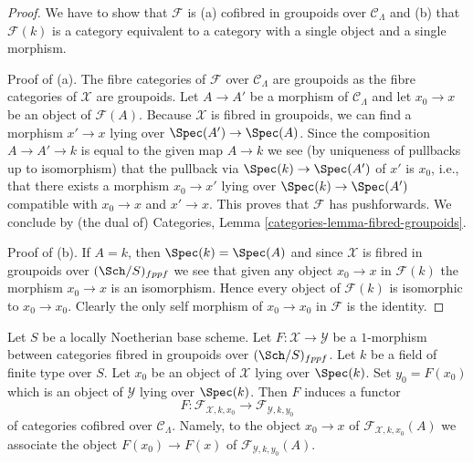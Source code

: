\begin{proof}
We have to show that $\mathcal{F}$ is (a) cofibred in groupoids over
$\mathcal{C}_\Lambda$ and (b) that $\mathcal{F}(k)$ is a category equivalent
to a category with a single object and a single morphism.

\medskip\noindent
Proof of (a). The fibre categories of $\mathcal{F}$
over $\mathcal{C}_\Lambda$ are groupoids as the fibre categories
of $\mathcal{X}$ are groupoids. Let $A \to A'$ be a morphism of
$\mathcal{C}_\Lambda$ and let $x_0 \to x$ be an object of $\mathcal{F}(A)$.
Because $\mathcal{X}$ is fibred in groupoids, we can find a morphism
$x' \to x$ lying over $\Spec(A') \to \Spec(A)$. Since the composition
$A \to A' \to k$ is equal to the given map $A \to k$ we see (by uniqueness
of pullbacks up to isomorphism) that the pullback via $\Spec(k) \to \Spec(A')$
of $x'$ is $x_0$, i.e., that there exists a morphism $x_0 \to x'$
lying over $\Spec(k) \to \Spec(A')$ compatible with
$x_0 \to x$ and $x' \to x$. This proves that $\mathcal{F}$ has
pushforwards. We conclude by (the dual of)
Categories, Lemma \ref{categories-lemma-fibred-groupoids}.

\medskip\noindent
Proof of (b). If $A = k$, then $\Spec(k) = \Spec(A)$ and since $\mathcal{X}$
is fibred in groupoids over $(\Sch/S)_{fppf}$ we see that given any object
$x_0 \to x$ in $\mathcal{F}(k)$ the morphism $x_0 \to x$ is an isomorphism.
Hence every object of $\mathcal{F}(k)$ is isomorphic to $x_0 \to x_0$.
Clearly the only self morphism of $x_0 \to x_0$ in $\mathcal{F}$ is
the identity.
\end{proof}

\noindent
Let $S$ be a locally Noetherian base scheme. Let
$F : \mathcal{X} \to \mathcal{Y}$ be a $1$-morphism between categories
fibred in groupoids over $(\Sch/S)_{fppf}$. Let $k$ be a field
of finite type over $S$. Let $x_0$ be an object of $\mathcal{X}$ lying
over $\Spec(k)$. Set $y_0 = F(x_0)$ which is an object of $\mathcal{Y}$
lying over $\Spec(k)$. Then $F$ induces a functor
\begin{equation}
\label{equation-functoriality}
F :
\mathcal{F}_{\mathcal{X}, k, x_0}
\longrightarrow
\mathcal{F}_{\mathcal{Y}, k, y_0}
\end{equation}
of categories cofibred over $\mathcal{C}_\Lambda$. Namely, to the object
$x_0 \to x$ of $\mathcal{F}_{\mathcal{X}, k, x_0}(A)$ we associate
the object $F(x_0) \to F(x)$ of $\mathcal{F}_{\mathcal{Y}, k, y_0}(A)$.


